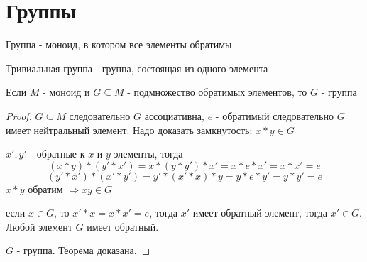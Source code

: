 \documentclass[../main/document.tex]{subfiles}
\begin{document}
\section{Группы}
\begin{dfn}[Группа]
Группа - моноид, в котором все элементы обратимы
\end{dfn}
\begin{dfn}
Тривиальная группа - группа, состоящая из одного элемента
\end{dfn}
\begin{thm}
Если $M$ - моноид и $G\subseteq M$ - подмножество обратимых элементов, то $G$ - группа
\begin{proof}

$G\subseteq M$ следовательно $G$ ассоциативна, 
$e$ - обратимый следовательно $G$ имеет нейтральный элемент. 
Надо доказать замкнутость: $x*y\in G$

$x',y'$ - обратные к $x$ и $y$ элементы, тогда
$$(x*y)*(y'*x')=x*(y*y')*x'=x*e*x'=x*x'=e$$
$$(y'*x')*(x'*y')=y'*(x'*x)*y=y*e*y'=y*y'=e$$
$x*y$ обратим $\Rightarrow xy\in G$

если $x\in G$, то $x'*x=x*x'=e$, тогда $x'$  имеет обратный элемент, тогда $x'\in G$. Любой элемент $G$ имеет обратный.

$G$ - группа. Теорема доказана.

\end{proof}
\end{thm}
\end{document}
